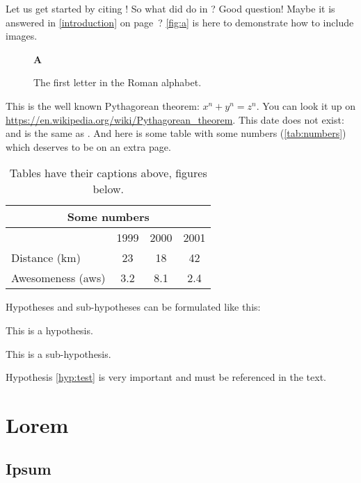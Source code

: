 Let us get started by citing \cite{BeckKKF13}!
So what did \citeauthor{BeckKKF13} do in \citeyear{BeckKKF13}?
Good question!
Maybe it is answered in \cref{introduction} on page~\pageref{introduction}?
\autoref{fig:a} is here to demonstrate how to include images.
\begin{figure}[bt]%
  \begin{center}{\huge\bfseries A}\end{center}
  \caption{The first letter in the Roman alphabet.}\label{fig:a}
\end{figure}
This is the well known Pythagorean theorem: $x^n + y^n = z^n$.
You can look it up on \url{https://en.wikipedia.org/wiki/Pythagorean_theorem}.
This date does not exist: 
and is the same as .
And here is some table with some numbers (\autoref{tab:numbers})
which deserves to be on an extra page.

\begin{table}[p]%
  \caption{Tables have their captions above, figures below.}
  \begin{center}
    \begin{tabular}{lccc}\toprule
      \multicolumn{4}{c}{Some numbers}       \\\midrule
                        & 1999 & 2000 & 2001 \\\cmidrule(l){2-4}
      Distance (km)     & 23   & 18   & 42   \\
      Awesomeness (aws) & 3.2  & 8.1  & 2.4  \\\bottomrule
    \end{tabular}
  \end{center}\label{tab:numbers}%
\end{table}

Hypotheses and sub-hypotheses can be formulated like this:
\begin{hypothesis}
\label{hyp:test}
This is a hypothesis.
\end{hypothesis}
\begin{shypothesis}
\label{shyp:test}
This is a sub-hypothesis.
\end{shypothesis}
Hypothesis \cref{hyp:test} is very important and must be referenced in the text.

\section{Lorem} \label{sec:lorem}
\lipsum[1-3]

\subsection{Ipsum} \label{ssec:ipsum}
\lipsum[4-7]
